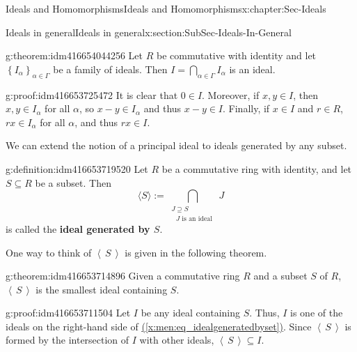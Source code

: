 \documentclass[oneside,10pt,]{book}
\newcommand{\terminology}[1]{\textbf{#1}}
\numberwithin{equation}{section}
\newcommand{\ideal}[1]{\left\langle\, #1 \,\right\rangle}
\newcommand{\set}[1]{\left\{ {#1} \right\}}
\begin{document}
%
%
\typeout{************************************************}
\typeout{************************************************}
%
\begin{chapterptx}{Ideals and Homomorphisms}{}{Ideals and Homomorphisms}{}{}{x:chapter:Sec-Ideals}
%
%
\typeout{************************************************}
\typeout{************************************************}
%
\begin{sectionptx}{Ideals in general}{}{Ideals in general}{}{}{x:section:SubSec-Ideals-In-General}
\begin{theorem}{}{}{g:theorem:idm416654044256}%
Let \(R\) be commutative with identity and let \(\set{I_{\alpha}}_{\alpha\in \Gamma}\) be a family of ideals. Then \(I = \bigcap\limits_{\alpha\in \Gamma} I_\alpha\) is an ideal.%
\end{theorem}
\begin{proofptx}{}{g:proof:idm416653725472}
It is clear that \(0\in I\). Moreover, if \(x,y\in I\), then \(x,y\in I_\alpha\) for all \(\alpha\), so \(x-y\in I_\alpha\) and thus \(x-y\in I\). Finally, if \(x\in I\) and \(r\in R\), \(rx\in I_\alpha\) for all \(\alpha\), and thus \(rx\in I\).%
\end{proofptx}
We can extend the notion of a principal ideal to ideals generated by any subset.%
\begin{definition}{}{g:definition:idm416653719520}%
Let \(R\) be a commutative ring with identity, and let \(S\subseteq R\) be a subset. Then%
\begin{equation}
\langle S \rangle := \bigcap\limits_{\substack{J\supseteq S\\\text{ \(J\) is an ideal } } } J\label{x:men:eq_idealgeneratedbyset}
\end{equation}
is called the \terminology{ideal generated by \(S\)}.%
\end{definition}
One way to think of \(\ideal{S}\) is given in the following theorem.%
\begin{theorem}{}{}{g:theorem:idm416653714896}%
Given a commutative ring \(R\) and a subset \(S\) of \(R\), \(\ideal{S}\) is the smallest ideal containing \(S\).%
\end{theorem}
\begin{proofptx}{}{g:proof:idm416653711504}
Let \(I\) be any ideal containing \(S\). Thus, \(I\) is one of the ideals on the right-hand side of \hyperref[x:men:eq_idealgeneratedbyset]{(\ref{x:men:eq_idealgeneratedbyset})}. Since \(\ideal{S}\) is formed by the intersection of \(I\) with other ideals, \(\ideal{S}\subseteq I\).%

\end{proofptx}
\end{sectionptx}
\end{chapterptx}
\end{document}
